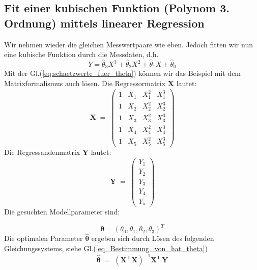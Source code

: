 \subsection{Fit einer kubischen Funktion (Polynom 3. Ordnung) mittels linearer Regression}
Wir nehmen wieder die gleichen Messwertpaare wie eben. Jedoch fitten wir
nun eine kubische Funktion durch die Messdaten, d.h.
\begin{equation}
Y = \hat\theta_3 X^3 + \hat\theta_2 X^2 + \hat\theta_1 X +
\hat\theta_0
\end{equation}
Mit der Gl.(\ref{eq:schaetzwerte_fuer_theta}) können wir
das Beispiel mit dem Matrixformalismus auch lösen.
Die Regressormatrix $\boldsymbol X$ lautet:
\begin{equation}
	\boldsymbol{X} \; = \;
	\left(
	\begin{array}{cccc}
		1 & X_1 & X_1^2 & X_1^3 \\
		1 & X_2 & X_2^2 & X_2^3 \\
		1 & X_3 & X_3^2 & X_3^3\\
		1 & X_4 & X_4^2 & X_4^3\\
		1 & X_5 & X_5^2 & X_5^3
	\end{array}
	\right)
\end{equation}
Die Regressandenmatrix $\boldsymbol Y$ lautet:
\begin{equation}
	\boldsymbol{Y} \; = \;
	\left(
	\begin{array}{cc}
		Y_1 \\
		Y_2 \\
		Y_3 \\
		Y_4 \\
		Y_5
	\end{array}
	\right)
\end{equation}
Die gesuchten Modellparameter sind:

$$
\boldsymbol\theta = \left(\theta_0, \theta_1, \theta_2,\theta_3 \right)^T
$$
Die optimalen Parameter $\boldsymbol{\hat \theta}$ ergeben sich durch Lösen
des folgenden Gleichungssystems, siehe Gl.(\ref{eq_Bestimmung_von_hat_theta})
$$
\boldsymbol{\hat \theta} \; = \;
\left( \mathbf{X}^\mathsf{T}  \, \mathbf{X} \right)^{-1} \mathbf{X}^\mathsf{T} \, \mathbf{Y}
$$

